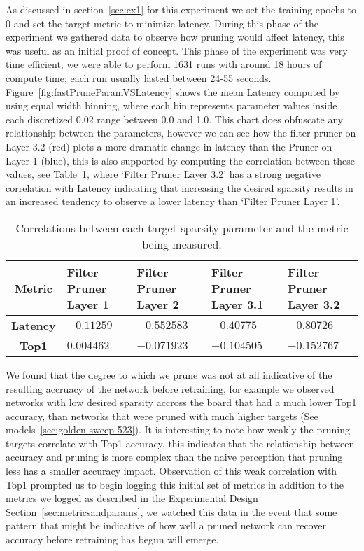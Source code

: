 \documentclass[../Dissertation.tex]{subfiles}
\begin{document}
As discussed in section~\ref{sec:ex1} for this experiment we set the training epochs to 0 and set the target metric to minimize latency. 
During this phase of the experiment we gathered data to observe how pruning would affect latency, this was useful as an initial proof of concept.
This phase of the experiment was very time efficient, we were able to perform 1631 runs with around 18 hours of compute time; each run usually lasted between 24-55 seconds. 
Figure~\ref{fig:fastPruneParamVSLatency} shows the mean Latency computed by using equal width binning, where each bin represents parameter values inside each discretized 0.02 range between 0.0 and 1.0.
This chart does obfuscate any relationship between the parameters, however we can see how the filter pruner on Layer 3.2 (red) plots a more dramatic change in latency than the Pruner on Layer 1 (blue), this is also supported by computing the correlation between these values, see Table~\ref{tab:fastPruneCorrelations}, where `Filter Pruner Layer 3.2' has a strong negative correlation with Latency indicating that increasing the desired sparsity results in an increased tendency to observe a lower latency than `Filter Pruner Layer 1'.

\singlespacing
\begin{table}[H]
    \centering
    \begin{tabular}{@{}cp{26mm}p{26mm}p{26mm}p{26mm}@{}}
    \toprule
    \textbf{Metric}  & \textbf{Filter Pruner  Layer 1} & \textbf{Filter Pruner Layer 2} & \textbf{Filter Pruner Layer 3.1} & \textbf{Filter Pruner Layer 3.2} \\ \midrule
    \textbf{Latency} & $-0.11259$                        & $-0.552583$                      & $-0.40775$                         & $-0.80726$                         \\
    \textbf{Top1}    & $0.004462$                        & $-0.071923$                      & $-0.104505$                        & $-0.152767$                        \\ \bottomrule
    \end{tabular}
    \caption{Correlations between each target sparsity parameter and the metric being measured.}
    \label{tab:fastPruneCorrelations}
\end{table}
\doublespacing

We found that the degree to which we prune was not at all indicative of the resulting accruacy of the network before retraining, for example we observed networks with low desired sparsity accross the board that had a much lower Top1 accuracy, than networks that were pruned with much higher targets (See models~\ref{sec:golden-sweep-523}).
It is interesting to note how weakly the pruning targets correlate with Top1 accuracy, this indicates that the relationship between accuracy and pruning is more complex than the naive perception that pruning less has a smaller accuracy impact.
Observation of this weak correlation with Top1 prompted us to begin logging this initial set of metrics in addition to the metrics we logged as described in the Experimental Design Section~\ref{sec:metricsandparams}, we watched this data in the event that some pattern that might be indicative of how well a pruned network can recover accuracy before retraining has begun will emerge.
\end{document}
